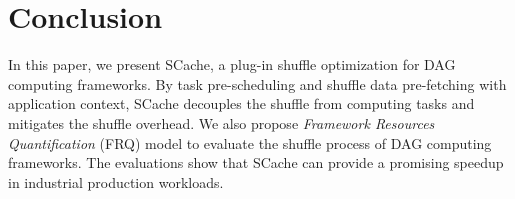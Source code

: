 \section{Conclusion}\label{conclusion}
In this paper, we present SCache, a plug-in shuffle optimization for DAG computing frameworks. 
By task pre-scheduling and shuffle data pre-fetching with application context, SCache decouples the shuffle from computing tasks and mitigates the shuffle overhead. 
{\color{black}
We also propose \textit{Framework Resources Quantification} (FRQ) model to evaluate the shuffle process of DAG computing frameworks. 
The evaluations show that SCache can provide a promising speedup in industrial production workloads. 
}
